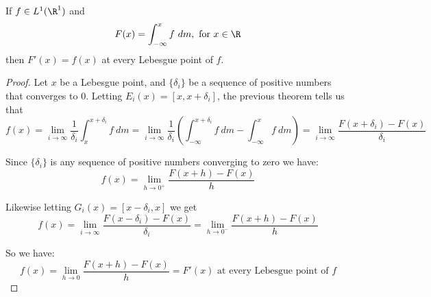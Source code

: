 \begin{corollary}\label{7.11}
If $f\in L^1(\R^1)$ and \[F(x) = \int_{-\infty}^x f~dm, \text{ for }x\in \R\]
then $F'(x) = f(x)$ at every Lebesgue point of $f$.

\begin{proof}
    Let $x$ be a Lebesgue point, and $\{\delta_i\}$ be a sequence of positive numbers that converges to $0$. Letting $E_i(x) = [x,x+\delta_i]$, the previous theorem tells us that 
    \[f(x) = \lim_{i\rightarrow\infty} \frac{1}{\delta_i}\int_{x}^{x+\delta_i}f~dm = \lim_{i\rightarrow\infty}\frac{1}{\delta_i}(\int_{-\infty}^{x+\delta_i} f~dm - \int_{-\infty}^x f~dm) = \lim_{i\rightarrow\infty}\frac{F(x+\delta_i) - F(x)}{\delta_i} \]

    Since $\{\delta_i\}$ is any sequence of positive numbers converging to zero we have:\[f(x) = \lim_{h\rightarrow 0^+}\frac{F(x+h) - F(x)}{h}\]
    
    Likewise letting $G_i(x) = [x-\delta_i,x]$ we get \[f(x) = \lim_{i\rightarrow\infty}\frac{F(x-\delta_i) - F(x)}{\delta_i} = \lim_{h\rightarrow 0^-}\frac{F(x+h) - F(x)}{h} \]


    So we have:\[f(x) = \lim_{h\rightarrow 0}\frac{F(x+h) - F(x)}{h} = F'(x) \text{ at every Lebesgue point of }f\]
\end{proof}
\end{corollary}

